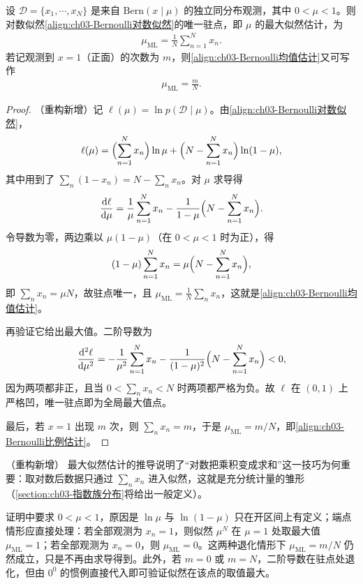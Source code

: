\documentclass[../../main.tex]{subfiles}
\begin{document}
\begin{proposition}\label{proposition:ch03-Bernoulli最大似然}
设 $\mathcal{D}=\{x_1,\cdots,x_N\}$ 是来自 $\mathrm{Bern}(x\mid\mu)$ 的独立同分布观测，其中 $0<\mu<1$。则对数似然\eqref{align:ch03-Bernoulli对数似然}的唯一驻点，即 $\mu$ 的最大似然估计，为
\begin{align}
\mu_{\mathrm{ML}}=\frac{1}{N}\sum_{n=1}^{N}x_n.
\label{align:ch03-Bernoulli均值估计}
\end{align}
若记观测到 $x=1$（正面）的次数为 $m$，则\eqref{align:ch03-Bernoulli均值估计}又可写作
\begin{align}
\mu_{\mathrm{ML}}=\frac{m}{N}.
\label{align:ch03-Bernoulli比例估计}
\end{align}
\end{proposition}
\begin{proof}
（重构新增）记 $\ell(\mu)=\ln p(\mathcal{D}\mid\mu)$。由\eqref{align:ch03-Bernoulli对数似然}，
\begin{align*}
\ell(\mu)=\Bigl(\sum_{n=1}^{N}x_n\Bigr)\ln\mu+\Bigl(N-\sum_{n=1}^{N}x_n\Bigr)\ln(1-\mu),
\end{align*}
其中用到了 $\sum_{n}(1-x_n)=N-\sum_{n}x_n$。对 $\mu$ 求导得
\begin{align*}
\frac{\mathrm{d}\ell}{\mathrm{d}\mu}=\frac{1}{\mu}\sum_{n=1}^{N}x_n-\frac{1}{1-\mu}\Bigl(N-\sum_{n=1}^{N}x_n\Bigr).
\end{align*}
令导数为零，两边乘以 $\mu(1-\mu)$（在 $0<\mu<1$ 时为正），得
\begin{align*}
(1-\mu)\sum_{n=1}^{N}x_n=\mu\Bigl(N-\sum_{n=1}^{N}x_n\Bigr),
\end{align*}
即 $\sum_{n}x_n=\mu N$，故驻点唯一，且 $\mu_{\mathrm{ML}}=\frac{1}{N}\sum_{n}x_n$，这就是\eqref{align:ch03-Bernoulli均值估计}。

再验证它给出最大值。二阶导数为
\begin{align*}
\frac{\mathrm{d}^{2}\ell}{\mathrm{d}\mu^{2}}=-\frac{1}{\mu^{2}}\sum_{n=1}^{N}x_n-\frac{1}{(1-\mu)^{2}}\Bigl(N-\sum_{n=1}^{N}x_n\Bigr)<0,
\end{align*}
因为两项都非正，且当 $0<\sum_{n}x_n<N$ 时两项都严格为负。故 $\ell$ 在 $(0,1)$ 上严格凹，唯一驻点即为全局最大值点。

最后，若 $x=1$ 出现 $m$ 次，则 $\sum_{n}x_n=m$，于是 $\mu_{\mathrm{ML}}=m/N$，即\eqref{align:ch03-Bernoulli比例估计}。
\end{proof}

\begin{remark}（重构新增）
最大似然估计的推导说明了“对数把乘积变成求和”这一技巧为何重要：取对数后数据只通过 $\sum_n x_n$ 进入似然，这就是充分统计量的雏形（\cref{section:ch03-指数族分布}将给出一般定义）。

证明中要求 $0<\mu<1$，原因是 $\ln\mu$ 与 $\ln(1-\mu)$ 只在开区间上有定义；端点情形应直接处理：若全部观测为 $x_n=1$，则似然 $\mu^{N}$ 在 $\mu=1$ 处取最大值 $\mu_{\mathrm{ML}}=1$；若全部观测为 $x_n=0$，则 $\mu_{\mathrm{ML}}=0$。这两种退化情形下 $\mu_{\mathrm{ML}}=m/N$ 仍然成立，只是不再由求导得到。此外，若 $m=0$ 或 $m=N$，二阶导数在驻点处退化，但由 $0^{0}$ 的惯例直接代入即可验证似然在该点的取值最大。
\end{remark}
\end{document}

